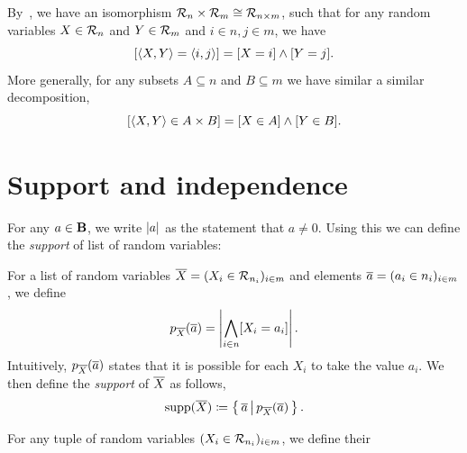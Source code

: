 \begin{remark}
  By~, we have an isomorphism $\mathcal{R}_n \times \mathcal{R}_m \cong \mathcal{R}_{n \times m}$, such that for any random variables $X\in\mathcal{R}_n$ and $Y\in\mathcal{R}_m$ and $i\in n,j\in m$, we have 
  \[ [\left\langle X,Y\right\rangle = \left\langle i,j\right\rangle] = [X = i] \wedge [Y = j]. \]
  More generally, for any subsets $A\subseteq n$ and $B \subseteq m$ we have similar a similar decomposition,
  \[ [\left\langle X,Y\right\rangle \in A \times B] = [X \in A] \wedge [Y \in B]. \]
\end{remark}

\section{Support and independence}\label{sec:supportandindependence}

For any $a\in\mathbf{B}$, we write $\left|a\right|$ as the statement that $a \neq 0$. Using this we can define the \emph{support} of list of random variables:

\begin{definition}[Support]\label{def:support}
  For a list of random variables $\overline{X} = (X_i\in\mathcal{R}_{n_i})_{i\in m}$ and elements $\overline{a} = (a_i \in n_i)_{i\in m}$, we define
  \[ p_{\overline{X}}(\overline{a}) = \left|\bigwedge_{i\in n}[X_i = a_i]\right|. \]
  Intuitively, $p_{\overline{X}}(\overline{a})$ states that it is possible for each $X_i$ to take the value $a_i$. We then define the \emph{support} of $\overline{X}$ as follows,
  \[ \operatorname{supp}(\overline{X}) \coloneq \left\{\,\overline{a}\,\middle|\,p_{\overline{X}}(\overline{a})\,\right\}. \]
\end{definition}

For any tuple of random variables $(X_i\in\mathcal{R}_{n_i})_{i\in m}$, we define their